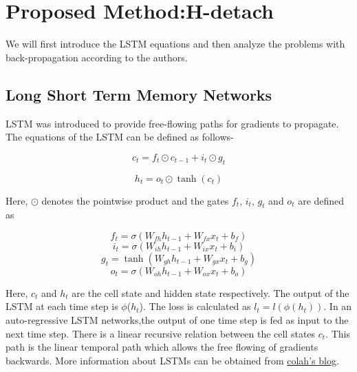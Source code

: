 \section{Proposed Method:H-detach}
We will first introduce the LSTM equations and then analyze the problems with back-propagation according to the authors.

\subsection{Long Short Term Memory Networks}
LSTM was introduced to provide free-flowing paths for gradients to propagate. The equations of the LSTM can be defined as follows-
\begin{center}
    \begin{equation}\label{eq1}
         c_t=f_t \odot c_{t-1} + i_t \odot g_t
    \end{equation}
   
\end{center}

\begin{center}
    \begin{equation} \label{eq2}
    h_t=o_t \odot \tanh(c_t)    
    \end{equation}
    
\end{center}

Here, $\odot$ denotes the pointwise product and the gates $f_t$, $i_t$, $g_t$ and $o_t$ are defined as

\begin{equation} \label{eq3}
 f_t=\sigma(W_{fh}h_{t-1}+W_{fx}x_{t}+b_f)    
 \end{equation}
 \begin{equation} \label{eq4}
 i_t=\sigma(W_{ih}h_{t-1}+W_{ix}x_{t}+b_i)    
 \end{equation}
 \begin{equation} \label{eq5}
    g_t=\tanh(W_{gh}h_{t-1}+W_{gx}x_{t}+b_g)    
    \end{equation}
    \begin{equation} \label{eq6}
    o_t=\sigma(W_{oh}h_{t-1}+W_{ox}x_{t}+b_o)    
    \end{equation}

Here, $c_t$ and $h_t$ are the cell state and hidden state respectively. The output of the LSTM at each time step is $\phi$($h_t$). The loss is calculated as $l_t=l(\phi(h_t))$. In an auto-regressive LSTM networks,the output of one time step is fed as input to the next time step. There is a linear recursive relation between the cell states $c_t$. This path is the linear temporal path which allows the free flowing of gradients backwards. More information about LSTMs can be obtained from \href{http://colah.github.io/posts/2015-08-Understanding-LSTMs/}{colah's blog}.


